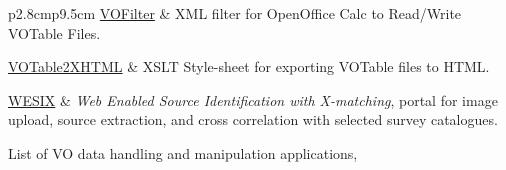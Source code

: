 \begin{table}
\begin{center}
\begin{scriptsizetabular}{p{2.8cm}p{9.5cm}}
	\href{http://services.china-vo.org/vofilter/} {VOFilter} & XML
	filter for OpenOffice Calc to Read/Write VOTable Files.\\
	\addlinespace
	
	\href{http://services.china-vo.org/votable2xhtml/}
	{VOTable2XHTML} & XSLT Style-sheet for exporting VOTable files
	to HTML.  \\
	\addlinespace
	
	\href{http://nvogre.phyast.pitt.edu:8080/wesix/} {WESIX} &
	\emph{Web Enabled Source Identification with X-matching},
	portal for image upload, source extraction, and cross
	correlation with selected survey catalogues.
	
	\end{scriptsizetabular}
	\end{center}
	\caption[List of VO data handling and manipulation
	applications]
	{List of VO data handling and manipulation applications,
	\fromlist}
	\label{tabVODataHandlingApps}
	\end{table}
	
	
	
